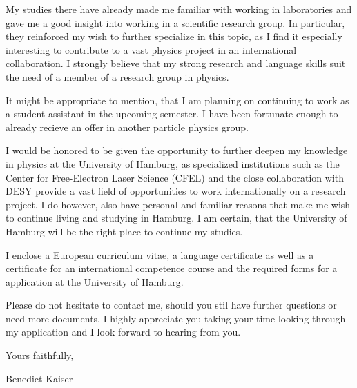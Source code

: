 \documentclass[11 pt, a4paper]{MyCV}
\begin{document}
My studies there have already made me familiar with working in laboratories and gave me a good insight into working in a scientific research group. In particular, they reinforced my wish to further specialize in this topic, as I find it especially interesting to contribute to a vast physics project in an international collaboration. I strongly believe that my strong research and language skills suit the need of a member of a research group in physics.

It might be appropriate to mention, that I am planning on continuing to work as a student assistant in the upcoming semester. I have been fortunate enough to already recieve an offer in another particle physics group. 

I would be honored to be given the opportunity to further deepen my knowledge in physics at the University of Hamburg, as specialized institutions such as the Center for Free-Electron Laser Science (CFEL) and the close collaboration with DESY provide a vast field of opportunities to work internationally on a research project. I do however, also have personal and familiar reasons that make me wish to continue living and studying in Hamburg. I am certain, that the University of Hamburg will be the right place to continue my studies.


I enclose a European curriculum vitae, a language certificate as well as a certificate for an international competence course and the required forms for a application at the University of Hamburg.

Please do not hesitate to contact me, should you stil have further questions or need more documents. I highly appreciate you taking your time looking through my application and I look forward to hearing from you.

Yours faithfully,

\vspace*{1.5cm}

Benedict Kaiser
\end{document}
